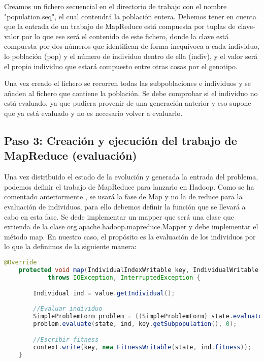 Creamos un fichero secuencial en el directorio de trabajo con el nombre "population.seq", el cual contendrá la población entera. Debemos tener en cuenta que la entrada de un trabajo de MapReduce est\'a compuesta por tuplas de clave-valor por lo que ese ser\'a el contenido de este fichero, donde la clave est\'a compuesta por dos números que identifican de forma inequívoca a cada individuo, lo población (pop) y el n\'umero de individuo dentro de ella (indiv), y el valor ser\'a el propio individuo que estará compuesto entre otras cosas por el genotipo.

Una vez creado el fichero se recorren todas las subpoblaciones e individuos y se a\~naden al fichero que contiene la población. Se debe comprobar si el individuo no est\'a evaluado, ya que pudiera provenir de una generación anterior y eso supone que ya est\'a evaluado y no es necesario volver a evaluarlo.

\subsection{Paso 3: Creación y ejecución del trabajo de MapReduce (evaluación)}

Una vez distribuido el estado de la evolución y generada la entrada del problema, podemos definir el trabajo de MapReduce para lanzarlo en Hadoop. Como se ha comentado anteriormente , se usar\'a la fase de Map y no la de reduce para la evaluación de individuos, para ello debemos definir la función que se llevar\'a a cabo en esta fase. Se dede implementar un mapper que ser\'a una clase que extienda de la clase org.apache.hadoop.mapreduce.Mapper y debe implementar el método map. En nuestro caso, el propósito es la evaluación de los individuos por lo que la definimos de la siguiente manera:

\begin{lstlisting}[language=Java]
	@Override
	protected void map(IndividualIndexWritable key, IndividualWritable value, Context context)
			throws IOException, InterruptedException {

		Individual ind = value.getIndividual();
		
		//Evaluar individuo
		SimpleProblemForm problem = ((SimpleProblemForm) state.evaluator.p_problem);
		problem.evaluate(state, ind, key.getSubpopulation(), 0);

		//Escribir fitness
		context.write(key, new FitnessWritable(state, ind.fitness));
	}
\end{lstlisting}

